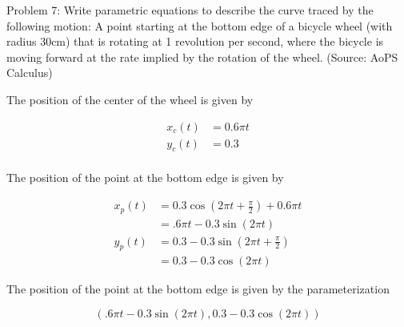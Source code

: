 Problem 7: Write parametric equations to describe the curve traced by the following motion: A point starting at the bottom edge of a bicycle wheel (with radius 30cm) that is rotating at 1 revolution per second, where the bicycle is moving forward at the rate implied by the rotation of the wheel. (Source: AoPS Calculus)

The position of the center of the wheel is given by

\begin{align*}
x_c(t) &= 0.6 \pi t \\
y_c(t) &= 0.3 \\
\end{align*}

The position of the point at the bottom edge is given by

\begin{align*}
x_p(t) &= 0.3 \cos (2 \pi t + \frac{\pi}{2}) + 0.6 \pi t \\
&= .6 \pi t - 0.3 \sin (2 \pi t) \\
y_p(t) &= 0.3 - 0.3 \sin (2 \pi t + \frac{\pi}{2}) \\
&= 0.3 - 0.3 \cos (2 \pi t)
\end{align*}

The position of the point at the bottom edge is given by the parameterization

$$ \boxed{\left( .6 \pi t - 0.3 \sin (2 \pi t), 0.3 - 0.3 \cos (2 \pi t) \right)} $$
